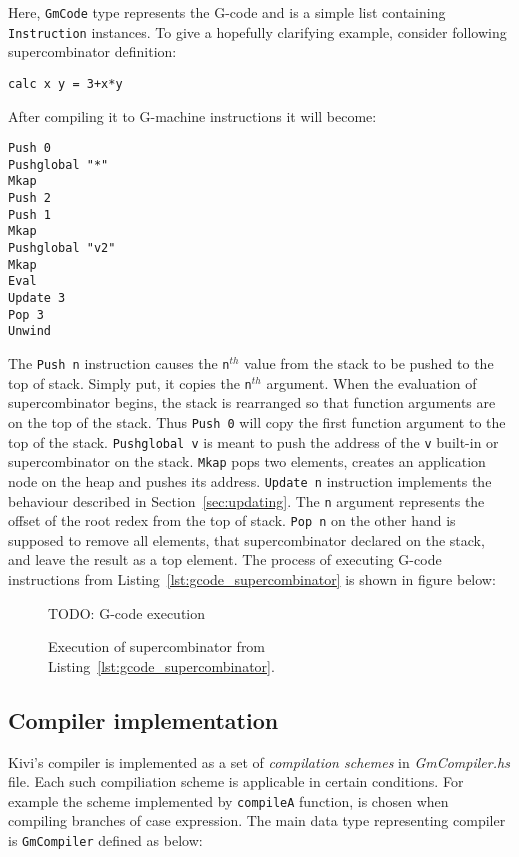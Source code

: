 \documentclass[12pt,a4paper]{report}
\begin{document}
Here, \texttt{GmCode} type represents the G-code and is a simple list containing
\texttt{Instruction} instances. To give a hopefully clarifying example,
consider following supercombinator definition:

\hspace*{-1.5in}
\begin{lstlisting}[style=haskell,label=lst:sc_to_compile,caption=Supercombinator to compile.]
calc x y = 3+x*y
\end{lstlisting}

After compiling it to G-machine instructions it will become:

\hspace*{-1.5in}
\begin{lstlisting}[style=haskell,label=lst:gcode_supercombinator,caption={Compiled
  supercombinator body.}]
Push 0
Pushglobal "*"
Mkap
Push 2
Push 1
Mkap
Pushglobal "v2"
Mkap
Eval
Update 3
Pop 3
Unwind
\end{lstlisting}

The \texttt{Push n} instruction causes the \texttt{n}$^{th}$ value from the
stack to be pushed to the top of stack. Simply put, it copies the
\texttt{n}$^{th}$ argument. When the evaluation of supercombinator begins, the
stack is rearranged so that function arguments are on the top of the stack.
Thus \texttt{Push 0} will copy the first function argument to the top of the
stack. \texttt{Pushglobal v} is meant to push the address of the \texttt{v}
built-in or supercombinator on the stack. \texttt{Mkap} pops two elements,
creates an application node on the heap and pushes its address. \texttt{Update
n} instruction implements the behaviour described in
Section~\ref{sec:updating}. The \texttt{n} argument represents the offset of
the root redex from the top of stack. \texttt{Pop n} on the other hand is
supposed to remove all elements, that supercombinator declared on the stack,
and leave the result as a top element. The process of executing G-code
instructions from Listing~\ref{lst:gcode_supercombinator} is shown in figure
below:

\begin{figure}[h!]
  \centering

  TODO: G-code execution

  \caption{Execution of supercombinator from Listing~\ref{lst:gcode_supercombinator}.}
  \label{fig:gcode_execution}
\end{figure}

\subsection{Compiler implementation}
Kivi's compiler is implemented as a set of \textit{compilation schemes} in
\textit{GmCompiler.hs} file. Each such compiliation scheme is applicable in
certain conditions. For example the scheme implemented by \texttt{compileA}
function, is chosen when compiling branches of case expression. The main data
type representing compiler is \texttt{GmCompiler} defined as below:
\end{document}
